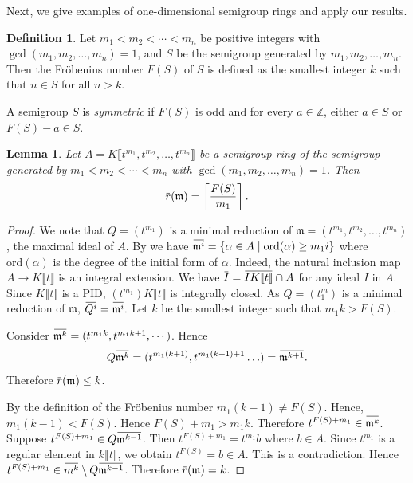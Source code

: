 \documentclass[12pt]{amsart}
\newtheorem{lem}[thm]{Lemma}
\theoremstyle{definition}
\newtheorem{defn}[thm]{Definition}
\theoremstyle{remark}
\numberwithin{equation}{section}
\newcommand{\bbZ}{\ensuremath{\mathbb Z}}
\newcommand{\m}{{\mathfrak m}}
\newcommand{\ol}[1]{\mkern 1.5mu\overline{\mkern-1.5mu#1\mkern-1.5mu}\mkern 1.5mu} %
\begin{document}
\par 
Next, we give examples of one-dimensional semigroup rings and apply our results.

\begin{defn} \label{NormalRedSemiG}
Let $m_1 < m_2< \cdots< m_n$ be positive integers with 
$\gcd(m_1, m_2, \ldots, m_n) = 1$, 
and $S$ be the semigroup generated by $m_1, m_2, \ldots, m_n$. 
Then the Fr\"obenius number $F(S)$  of $S$ is defined as the 
smallest integer $k$ such that $n \in S$ for all $n >k$.
\par 
A semigroup $S$ is \textit{symmetric} if $F(S)$ is odd and for every $a \in \bbZ$, 
either $a \in S$ or $F(S)-a \in S$. 
\end{defn}

\begin{lem} \label{lemma:redNumSemG}
Let $A = K\llbracket t^{m_1}, t^{m_2}, \ldots, t^{m_n} \rrbracket$ 
be a semigroup ring of the semigroup generated 
by $m_1 < m_2< \cdots< m_n$ with $\gcd(m_1, m_2, \ldots, m_n) = 1$. 
Then
\[
\ol{r}(\m) = \left\lceil \frac{F(S)}{m_1} \right\rceil.
\] 
\end{lem}
 
\begin{proof}
We note that $Q =  (t^{m_1}) $ is a minimal reduction of 
$\m = (t^{m_1}, t^{m_2}, \ldots, t^{m_n})$, 
the maximal ideal of $A$. 
By \cite[Example 7.3]{HKU} we have $\ol{\m^i} = \{\alpha \in A \mid \textrm{ord}(\alpha) \geq m_1i \}$ where $\textrm{ord}(\alpha)$ is the degree of the initial form of $\alpha$. 
Indeed, the natural inclusion map 
$A \to K\llbracket t \rrbracket$ is an integral extension. 
We have $\ol{I} = \ol{IK\llbracket t \rrbracket} \cap A$ 
for any ideal $I$ in $A$. Since $K\llbracket t \rrbracket$ is a PID, $(t^{m_1})K\llbracket t \rrbracket$ is integrally closed. 
As $Q = (t^m_1)$ is a minimal reduction of $\m$, 
$\ol{Q^i} = \ol{\m^i}.$ Let $k$ be the smallest integer such that $m_1k>F(S).$
\par     
Consider $\ol{\m^k} =  (t^{m_1k},  t^{m_1k+1}, \cdots )$. 
Hence 
\[
Q\ol{\m^k} = (t^{m_1(k+1)}, t^{m_1(k+1)+1} \ldots ) = \ol{\m^{k+1}}.
\] 
Therefore $\ol{r}(\m) \leq k$. 
\par 
By the definition of the Fr\"obenius number $m_1(k-1) \neq F(S)$. 
Hence, $m_1(k-1) < F(S)$. 
Hence $F(S)+ m_1 > m_1k$. 
Therefore $t^{F(S)+ m_1} \in \ol{\m^{k}}$. 
Suppose $t^{F(S)+ m_1} \in Q\ol{\m^{k-1}}$. 
Then $t^{F(S)+ m_1} = t^{m_1}b$ where $b \in A$. 
Since $t^{m_1}$ is a regular element in $k\llbracket t \rrbracket$, 
we obtain $t^{F(S)} = b \in A$. 
This is a contradiction. 
Hence $t^{F(S)+ m_1} \in \ol{m^{k}} \setminus Q\ol{\m^{k-1}}$. Therefore $\ol{r}(\m) = k$.
\end{proof}
\end{document}
